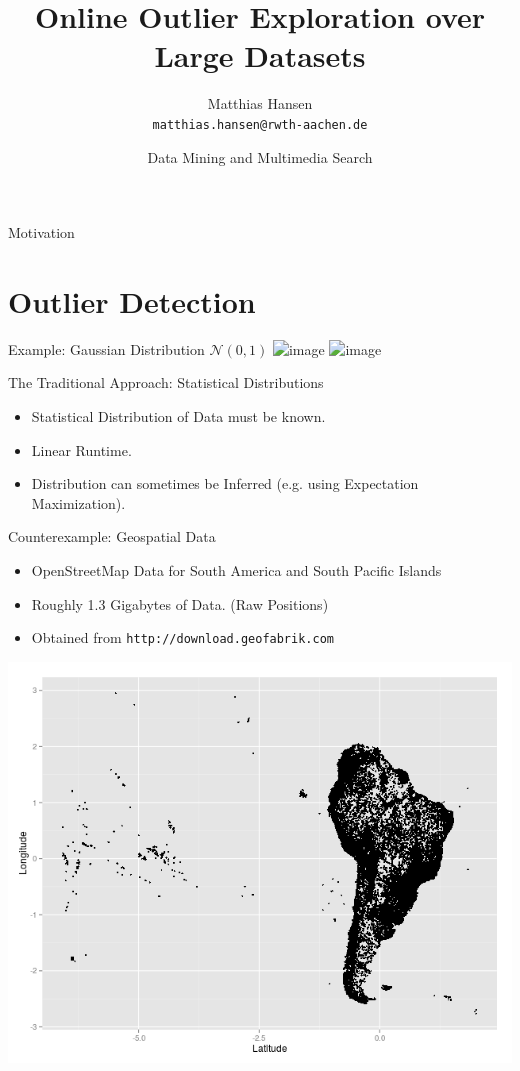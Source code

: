 \documentclass{beamer}
\title{Online Outlier Exploration over Large Datasets}
\author{Matthias Hansen \\
        \texttt{matthias.hansen@rwth-aachen.de}}
\date{Data Mining and Multimedia Search}
\institute{RWTH Aachen University}
\begin{document}
\frame{\titlepage}

\begin{frame}{Motivation}
\end{frame}
\section{Outlier Detection}



\begin{frame}{Example: Gaussian Distribution $\mathcal{N}(0,1)$}
    \centering
    \includegraphics<1>[width=.7\textwidth]{images/gaussian.png}
    \includegraphics<2>[width=.7\textwidth]{images/gaussian_lines.png}

\end{frame}

\begin{frame}{The Traditional Approach: Statistical Distributions}
    \begin{itemize}
        \item Statistical Distribution of Data must be known.
        \item Linear Runtime.
        \item Distribution can sometimes be Inferred (e.g. using Expectation Maximization).
    \end{itemize}
\end{frame}

\begin{frame}{Counterexample: Geospatial Data}
    \begin{itemize}
        \item OpenStreetMap Data for South America and South Pacific Islands

        \item Roughly 1.3 Gigabytes of Data. (Raw Positions)

        \item Obtained from \texttt{http://download.geofabrik.com}
    \end{itemize}
    \begin{center}
    \includegraphics[width=.7\textwidth]{images/south_america.png} 
    \end{center}
\end{frame}
\end{document}
